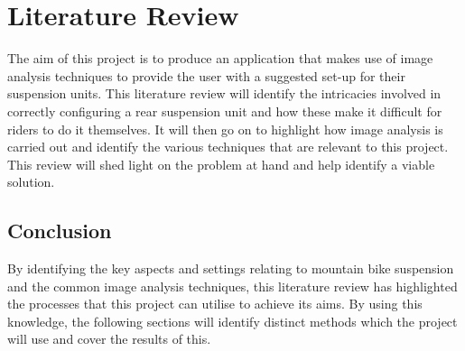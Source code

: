 \section{Literature Review}\label{sec:lit_review}
	The aim of this project is to produce an application that makes use of image analysis techniques to provide the user with a suggested set-up for their suspension units. This literature review will identify the intricacies involved in correctly configuring a rear suspension unit and how these make it difficult for riders to do it themselves. It will then go on to highlight how image analysis is carried out and identify the various techniques that are relevant to this project. This review will shed light on the problem at hand and help identify a viable solution.
	
	
	
	
	
	
	\subsection{Conclusion}
		By identifying the key aspects and settings relating to mountain bike suspension and the common image analysis techniques, this literature review has highlighted the processes that  this project can utilise to achieve  its aims. By using this knowledge, the following sections will identify distinct methods which the project will use and cover the results of this. 